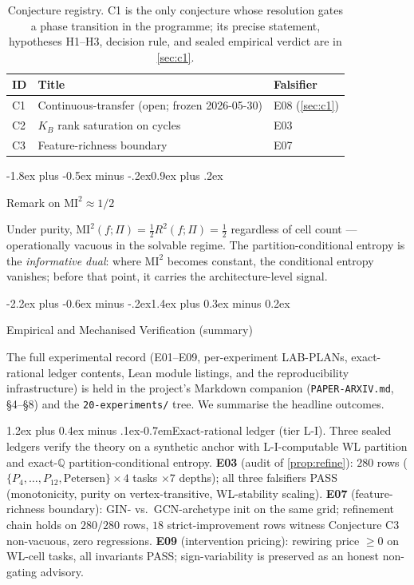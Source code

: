 \documentclass[10pt]{article}
\makeatletter
\def\section{\@startsection{section}{1}{\z@}%
  {-2.2ex plus -0.6ex minus -.2ex}{1.4ex plus 0.3ex minus 0.2ex}%
  {\normalsize\bf\raggedright\sffamily}}
\def\subsection{\@startsection{subsection}{2}{\z@}%
  {-1.8ex plus -0.5ex minus -.2ex}{0.9ex plus .2ex}%
  {\normalsize\bf\raggedright\sffamily}}
\def\paragraph{\@startsection{paragraph}{4}{\z@}%
  {1.2ex plus 0.4ex minus .1ex}{-0.7em}{\normalsize\bf}}
\theoremstyle{definition}
\theoremstyle{remark}
\makeatother
\begin{document}
\begin{table}[h]
\centering
\caption{Conjecture registry. C1 is the only conjecture whose
resolution gates a phase transition in the programme; its precise
statement, hypotheses H1--H3, decision rule, and sealed empirical
verdict are in \cref{sec:c1}.}
\label{tab:conj}
\begin{tabular}{@{}lll@{}}
\toprule
ID & Title & Falsifier \\
\midrule
C1 & Continuous-transfer (open; frozen 2026-05-30) & E08 (\cref{sec:c1}) \\
C2 & $K_B$ rank saturation on cycles & E03 \\
C3 & Feature-richness boundary & E07 \\
\bottomrule
\end{tabular}
\end{table}

\subsection{Remark on $\mathrm{MI}^2 \approx 1/2$}\label{sec:mi2}

Under purity, $\mathrm{MI}^2(f ; \Pi) = \tfrac{1}{2} R^2(f ; \Pi) = \tfrac{1}{2}$
regardless of cell count --- operationally vacuous in the solvable
regime. The partition-conditional entropy is the \emph{informative
dual}: where $\mathrm{MI}^2$ becomes constant, the conditional
entropy vanishes; before that point, it carries the
architecture-level signal.

\section{Empirical and Mechanised Verification (summary)}\label{sec:empirical}

The full experimental record (E01--E09, per-experiment LAB-PLANs,
exact-rational ledger contents, Lean module listings, and the
reproducibility infrastructure) is held in the project's Markdown
companion (\verb|PAPER-ARXIV.md|, \S4--\S8) and the
\verb|20-experiments/| tree. We summarise the headline outcomes.

\paragraph{Exact-rational ledger (tier L-I).} Three sealed ledgers
verify the theory on a synthetic anchor with L-I-computable WL
partition and exact-$\mathbb{Q}$ partition-conditional entropy.
\textbf{E03} (audit of \cref{prop:refine}): $280$ rows
($\{P_4,\ldots,P_{12},\text{Petersen}\} \times 4$ tasks $\times 7$
depths); all three falsifiers PASS (monotonicity, purity on
vertex-transitive, WL-stability scaling).
\textbf{E07} (feature-richness boundary): GIN- vs.\ GCN-archetype
init on the same grid; refinement chain holds on $280/280$ rows,
$18$ strict-improvement rows witness Conjecture C3 non-vacuous, zero
regressions.
\textbf{E09} (intervention pricing): rewiring price $\ge 0$ on WL-cell
tasks, all invariants PASS; sign-variability is preserved as an
honest non-gating advisory.
\end{document}
